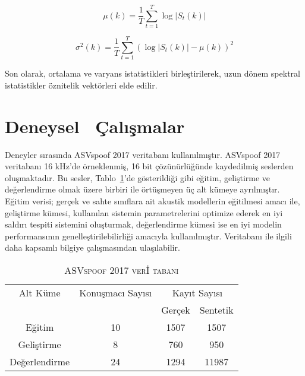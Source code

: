 \documentclass[conference, a4paper]{IEEEtran}
\begin{document}
\begin{equation}
    \mu(k) = \frac{1}{T}\sum_{t=1}^{T} \log \left|S_t(k)\right|
\end{equation}

\begin{equation}
    \sigma^2(k) = \frac{1}{T}\sum_{t=1}^{T}(\log \left|S_t(k)\right| - \mu(k))^2
\end{equation}

Son olarak, ortalama ve varyans istatistikleri birleştirilerek, uzun dönem spektral istatistikler öznitelik vektörleri
elde edilir.

\section{Deneysel {\ Ç}alışmalar}
Deneyler sırasında ASVspoof 2017\cite{kinnunen2017reddots} veritabanı kullanılmıştır. ASVspoof 2017 veritabanı 16
kHz'de örneklenmiş, 16 bit çözünürlüğünde kaydedilmiş seslerden oluşmaktadır. Bu sesler, Tablo~\ref{Dataset}'de
gösterildiği gibi eğitim, geliştirme ve değerlendirme olmak üzere birbiri ile örtüşmeyen üç alt kümeye ayrılmıştır.
Eğitim verisi; gerçek ve sahte sınıflara ait akustik modellerin eğitilmesi amacı ile, geliştirme kümesi, kullanılan
sistemin parametrelerini optimize ederek en iyi saldırı tespiti sistemini oluşturmak, değerlendirme kümesi ise en iyi
modelin performansının genelleştirilebilirliği amacıyla kullanılmıştır. Veritabanı ile ilgili daha kapsamlı bilgiye
\cite{kinnunen2017asvspoof} çalışmasından ulaşılabilir.

\begin{table}[ph]
    \centering
    \caption{\textsc{ASVspoof 2017 ver{\footnotesize  İ} tabanı}}
    \label{Dataset}
    \begin{tabular}{|c|c|cc|}
        \hline
        Alt Küme      & Konuşmacı Sayısı & \multicolumn{2}{c|}{Kayıt Sayısı}            \\
                      &                  & Gerçek                            & Sentetik \\ \hline
        Eğitim        & 10               & 1507                              & 1507     \\
        Geliştirme    & 8                & 760                               & 950      \\
        Değerlendirme & 24               & 1294                              & 11987    \\
        \hline
    \end{tabular}
\end{table}
\end{document}
